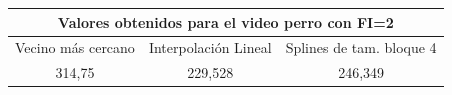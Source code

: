 \begin{figure}[ht]
	\begin{center}
	\end{center}
\end{figure}

\begin{figure}[ht]
	\begin{center}
	\end{center}
\end{figure}

\begin{center}
\begin{tabular}{| c | c | c |}
\hline
\multicolumn{3}{|c|}{Valores obtenidos para el video \textbf{perro} con FI=2}  \\
\hline
Vecino más cercano & Interpolación Lineal & Splines de tam. bloque 4  \\ 
\hline
314,75	& 229,528	&	246,349	\\
\hline
\end{tabular}
\end{center}


